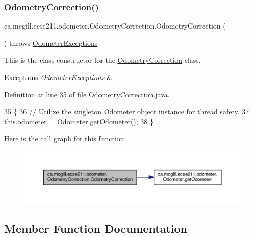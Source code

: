 \subsubsection{\texorpdfstring{Odometry\+Correction()}{OdometryCorrection()}}
{\footnotesize\ttfamily ca.\+mcgill.\+ecse211.\+odometer.\+Odometry\+Correction.\+Odometry\+Correction (\begin{DoxyParamCaption}{ }\end{DoxyParamCaption}) throws \hyperlink{classca_1_1mcgill_1_1ecse211_1_1odometer_1_1_odometer_exceptions}{Odometer\+Exceptions}}

This is the class constructor for the \hyperlink{classca_1_1mcgill_1_1ecse211_1_1odometer_1_1_odometry_correction}{Odometry\+Correction} class.


\begin{DoxyExceptions}{Exceptions}
{\em \hyperlink{classca_1_1mcgill_1_1ecse211_1_1odometer_1_1_odometer_exceptions}{Odometer\+Exceptions}} & \\
\hline
\end{DoxyExceptions}


Definition at line 35 of file Odometry\+Correction.\+java.


\begin{DoxyCode}
35                                                         \{
36     \textcolor{comment}{// Utilize the singleton Odometer object instance for thread safety.}
37     this.odometer = Odometer.\hyperlink{classca_1_1mcgill_1_1ecse211_1_1odometer_1_1_odometer_a99171f11e34dea918fa9dd069d721439}{getOdometer}();
38   \}
\end{DoxyCode}
Here is the call graph for this function\+:\nopagebreak
\begin{figure}[H]
\begin{center}
\leavevmode
\includegraphics[width=350pt]{classca_1_1mcgill_1_1ecse211_1_1odometer_1_1_odometry_correction_ad80b45e0bc4bf935494e075edcec739c_cgraph}
\end{center}
\end{figure}


\subsection{Member Function Documentation}
\mbox{\label{classca_1_1mcgill_1_1ecse211_1_1odometer_1_1_odometry_correction_a21a351682dc75060d6a5f15ad4775068}} 
